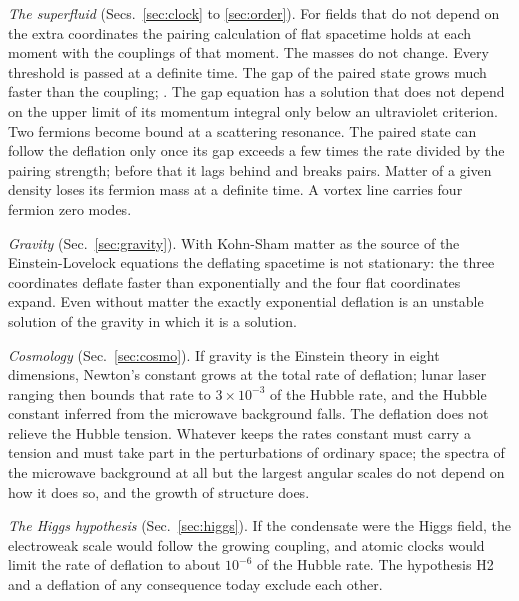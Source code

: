 \emph{The superfluid} (Secs.~\ref{sec:clock} to \ref{sec:order}). For fields that do not depend on
the extra coordinates the pairing calculation of flat spacetime holds at each moment with the
couplings of that moment. The masses do not change. Every threshold is passed at a definite time. The
gap of the paired state grows much faster than the coupling; . The gap equation has a solution that does not depend on the
upper limit of its momentum integral only below an ultraviolet criterion. Two fermions become bound at a scattering resonance. The
paired state can follow the deflation only once its gap exceeds a few times the rate divided by the
pairing strength; before that it lags behind and breaks pairs. Matter of a given density loses its
fermion mass at a definite time. A vortex line carries four fermion zero modes.

\emph{Gravity} (Sec.~\ref{sec:gravity}). With Kohn-Sham matter as the source of the Einstein-Lovelock
equations the deflating spacetime is not stationary: the three coordinates deflate faster than
exponentially and the four flat coordinates expand. Even without matter the exactly exponential
deflation is an unstable solution of the gravity in which it is a solution.

\emph{Cosmology} (Sec.~\ref{sec:cosmo}). If gravity is the Einstein theory in eight dimensions,
Newton's constant grows at the total rate of deflation; lunar laser ranging then bounds that rate to
$3\times10^{-3}$ of the Hubble rate, and the Hubble constant inferred from the microwave background
falls. The deflation does not relieve the Hubble tension. Whatever keeps the rates constant must
carry a tension and must take part in the perturbations of ordinary space; the spectra of the
microwave background at all but the largest angular scales do not depend on how it does so, and
the growth of structure does.

\emph{The Higgs hypothesis} (Sec.~\ref{sec:higgs}).   If the
condensate were the Higgs field, the electroweak scale would follow the growing coupling, and atomic
clocks would limit the rate of deflation to about $10^{-6}$ of the Hubble rate. The hypothesis H2 and
a deflation of any consequence today exclude each other.

